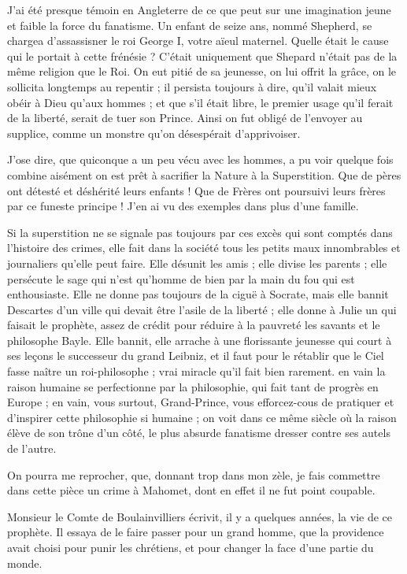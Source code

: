 \documentclass[french,twoside]{book} %
\begin{document}
J’ai été presque témoin en Angleterre de ce que peut sur une imagination jeune et faible la force du fanatisme. Un enfant de seize ans, nommé Shepherd, se chargea d’assassisner le roi George I, votre aïeul maternel. Quelle était le cause qui le portait à cette frénésie ? C’était uniquement que Shepard n’était pas de la même religion que le Roi. On eut pitié de sa jeunesse, on lui offrit la grâce, on le sollicita longtemps au repentir ; il persista toujours à dire, qu’il valait mieux obéir à Dieu qu’aux hommes ; et que s’il était libre, le premier usage qu’il ferait de la liberté, serait de tuer son Prince. Ainsi on fut obligé de l’envoyer au supplice, comme un monstre qu’on désespérait d’apprivoiser.\par
J’ose dire, que quiconque a un peu vécu avec les hommes, a pu voir quelque fois combine aisément on est prêt à sacrifier la Nature à la Superstition. Que de pères ont détesté et déshérité leurs enfants ! Que de Frères ont poursuivi leurs frères par ce funeste principe ! J’en ai vu des exemples dans plus d’une famille.\par
Si la superstition ne se signale pas toujours par ces excès qui sont comptés dans l’histoire des crimes, elle fait dans la société tous les petits maux innombrables et journaliers qu’elle peut faire. Elle désunit les amis ; elle divise les parents ; elle persécute le sage qui n’est qu’homme de bien par la main du fou qui est enthousiaste. Elle ne donne pas toujours de la ciguë à Socrate, mais elle bannit Descartes d’un ville qui devait être l’asile de la liberté ; elle donne à Julie un qui faisait le prophète, assez de crédit pour réduire à la pauvreté les savants et le philosophe Bayle. Elle bannit, elle arrache à une florissante jeunesse qui court à ses leçons le successeur du grand Leibniz, et il faut pour le rétablir que le Ciel fasse naître un roi-philosophe ; vrai miracle qu’il fait bien rarement. en vain la raison humaine se perfectionne par la philosophie, qui fait tant de progrès en Europe ; en vain, vous surtout, Grand-Prince, vous efforcez-cous de pratiquer et d’inspirer cette philosophie si humaine ; on voit dans ce même siècle où la raison élève de son trône d’un côté, le plus absurde fanatisme dresser contre ses autels de l’autre.\par
On pourra me reprocher, que, donnant trop dans mon zèle, je fais commettre dans cette pièce un crime à Mahomet, dont en effet il ne fut point coupable.\par
Monsieur le Comte de Boulainvilliers écrivit, il y a quelques années, la vie de ce prophète. Il essaya de le faire passer pour un grand homme, que la providence avait choisi pour punir les chrétiens, et pour changer la face d’une partie du monde.\par
\end{document}
